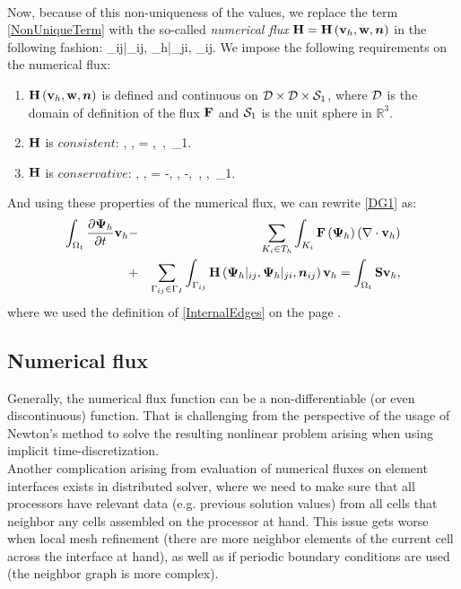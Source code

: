 \paragraph{}
Now, because of this non-uniqueness of the values, we replace the term \ref{NonUniqueTerm} with the so-called \textit{numerical flux} $\mathrm{\mathbf{H}} = \mathrm{\mathbf{H}}\left(\mathrm{\mathbf{v}}_h, \mathrm{\mathbf{w}}, \mbox{\boldmath $n$}\right)$ in the following fashion:
\be
\label{NumFluxDef}
\lo\mrF{}\ro \cdot \bfn_{ij}\ro \mrvh \approx \mrH{}|_{ij}, {\mrPsi_h}|_{ji}, \bfn_{ij}\ro \mrvh.
\ee
We impose the following requirements on the numerical flux:
\begin{enumerate}
	\item $\mathrm{\mathbf{H}}\left( \mathrm{\mathbf{v}}_h, \mathrm{\mathbf{w}}, \mbox{\boldmath $n$}\right)$ is defined and continuous on $\mathcal{D} \times \mathcal{D} \times \mathcal{S}_1$, where $\mathcal{D}$ is the domain of definition of the flux $\mathrm{\mathbf{F}}$ and $\mathcal{S}_1$ is the unit sphere in $\mathbb{R}^3$.
	\item $\mathrm{\mathbf{H}}$ is $consistent$:
		\be
			\label{FluxConsistent} \mrH\lo \mrvh, \mrvh, \bfn\ro = \mrF\lo \mrvh\ro \bfn,\ \mrvh\in{},\ \bfn\in{}_1.
		\ee
	\item $\mathrm{\mathbf{H}}$ is $conservative$:
		\be
			\label{FluxConservative} \mrH\lo \mrvh, \mrw, \bfn\ro = -\mrH\lo \mrw, \mrvh, -\bfn\ro,\ \mrvh, \mrw\in{},\ \bfn\in{}_1.
		\ee
 \end{enumerate}
And using these properties of the numerical flux, we can rewrite \ref{DG1} as:
\begin{eqnarray}
\label{DG2} \int_{\Omega_{t}} \frac{\partial{{\mathrm{\mathbf{\Psi}}_h}}}{\partial{t}} \mathrm{\mathbf{v}}_h & - & \sum_{K_i \in T_h}\int_{K_i}\mathrm{\mathbf{F}}\left({\mathrm{\mathbf{\Psi}}_h}\right) \left(\nabla \cdot \mathrm{\mathbf{v}}_h\right)\\ \nonumber & + & \sum_{\Gamma_{ij}\in\Gamma_I} \int_{\Gamma_{ij}} \mathrm{\mathbf{H}}\left({\mathrm{\mathbf{\Psi}}_h}|_{ij}, {\mathrm{\mathbf{\Psi}}_h}|_{ji}, \mbox{\boldmath $n$}_{ij}\right) \mathrm{\mathbf{v}}_h = \int_{\Omega_{t}} \mathrm{\mathbf{S}} \mathrm{\mathbf{v}}_h,
\end{eqnarray}
where we used the definition of \ref{InternalEdges} on the page \pageref{InternalEdges}.
\subsection{Numerical flux}
Generally, the numerical flux function can be a non-differentiable (or even discontinuous) function. That is challenging from the perspective of the usage of Newton's method to solve the resulting nonlinear problem arising when using implicit time-discretization.\ \\
Another complication arising from evaluation of numerical fluxes on element interfaces exists in distributed solver, where we need to make sure that all processors have relevant data (e.g. previous solution values) from all cells that neighbor any cells assembled on the processor at hand. This issue gets worse when local mesh refinement (there are more neighbor elements of the current cell across the interface at hand), as well as if periodic boundary conditions are used (the neighbor graph is more complex).
